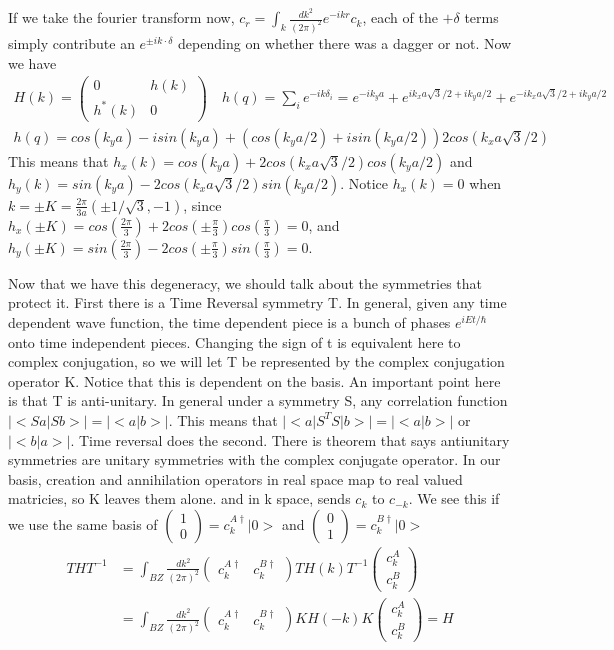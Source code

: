 If we take the fourier transform now, $c_r = \int_k \frac{dk^2}{(2\pi)^2}e^{-ikr} c_k$, each of the $+\delta$ terms simply contribute an $e^{\pm i k \cdot \delta}$ depending on whether there was a dagger or not. Now we have
\begin{align}
H(k)= 
\begin{pmatrix}
0 & h(k) \\
h^*(k) & 0
\end{pmatrix} \quad h(q) = \sum_i e^{-ik\delta_i} = e^{-ik_ya} + e^{ik_xa\sqrt{3}/2+ik_ya/2}+e^{-ik_xa\sqrt{3}/2+ik_ya/2} \\
h(q) = cos(k_ya)-i sin(k_ya) +(cos(k_ya/2)+i sin(k_ya/2))2cos(k_xa\sqrt{3}/2)
\end{align}
This means that $h_x(k) = cos(k_ya)+2cos(k_xa\sqrt{3}/2)cos(k_ya/2)$ and $h_y(k) = sin(k_ya)-2cos(k_xa\sqrt{3}/2)sin(k_ya/2)$. Notice $h_x(k) = 0$ when $k = \pm K = \frac{2\pi}{3a}(\pm1/\sqrt{3},-1)$, since $h_x(\pm K) = cos(\frac{2\pi}{3})+2cos(\pm\frac{\pi}{3})cos(\frac{\pi}{3})=0$, and $h_y(\pm K) = sin(\frac{2\pi}{3})-2cos(\pm\frac{\pi}{3})sin(\frac{\pi}{3})=0$.

Now that we have this degeneracy, we should talk about the symmetries that protect it. First there is a Time Reversal symmetry T. In general, given any time dependent wave function, the time dependent piece is a bunch of phases $e^{iEt/\hbar}$ onto time independent pieces. Changing the sign of t is equivalent here to complex conjugation, so we will let T be represented by the complex conjugation operator K. Notice that this is dependent on the basis. 
An important point here is that T is anti-unitary. In general under a symmetry S, any correlation function $|<Sa|Sb>| = |<a|b>|$. This means that $|<a|S^TS|b>| =|<a|b>|$ or $|<b|a>|$. Time reversal does the second. There is theorem that says antiunitary symmetries are unitary symmetries with the complex conjugate operator. In our basis, creation and annihilation operators in real space map to real valued matricies, so K leaves them alone. and in k space, sends $c_k$ to $c_{-k}$. We see this if we use the same basis of $\begin{pmatrix}
1 \\
0
\end{pmatrix} = c^{A\dag}_k|0>$ and  $\begin{pmatrix}
0 \\
1
\end{pmatrix} = c^{B\dag}_k|0>$
\begin{align}
THT^{-1}&=\int_{BZ}\frac{dk^2}{(2\pi)^2} 
\begin{pmatrix}
c^{A\dag}_k & c^{B\dag}_k
\end{pmatrix}
TH(k)T^{-1}
\begin{pmatrix}
c^{A}_k \\
c^{B}_k
\end{pmatrix}
 \\
&= \int_{BZ}\frac{dk^2}{(2\pi)^2} 
\begin{pmatrix}
c^{A\dag}_{k} & c^{B\dag}_{k}
\end{pmatrix}
KH(-k)K
\begin{pmatrix}
c^{A}_{k} \\
c^{B}_{k}
\end{pmatrix} = H
\end{align}

